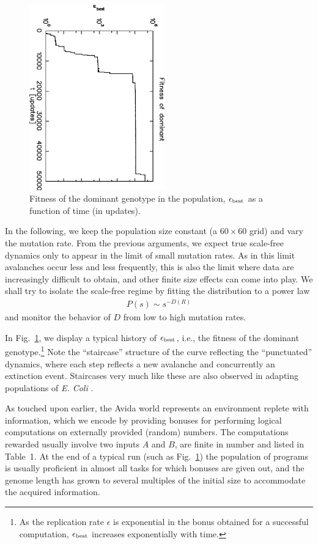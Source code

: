 \documentclass[letterpaper]{article}
\begin{document}
\begin{figure}[t]
\includegraphics[width=2.3in, angle=90]{fig2.eps}
\caption{Fitness of the dominant genotype in the population, $\epsilon_{\rm best}$ as a function of time (in updates).}
\label{fig2}
\end{figure}


In the following, we keep the population size constant (a $60\times60$
grid) and vary the mutation rate. From the previous arguments, we
expect true scale-free dynamics only to appear in the limit of small
mutation rates.  As in this limit avalanches occur less and less
frequently, this is also the limit where data are increasingly
difficult to obtain, and other finite size effects can come into play.
We shall try to isolate the scale-free regime by fitting the
distribution to a power law
\begin{eqnarray}
P(s)\sim s^{-D(R)}\label{power}
\end{eqnarray}
and monitor the behavior of $D$ from low to high mutation rates.

In Fig.~\ref{fig2}, we display a typical history of $\epsilon_{\rm
best}$, i.e., the fitness of the dominant genotype.\footnote{As the
replication rate $\epsilon$ is exponential in the bonus obtained for a
successful computation, $\epsilon_{\rm best}$ increases exponentially
with time.}  Note the ``staircase'' structure of the curve reflecting
the ``punctuated'' dynamics, where each step reflects a new avalanche
and concurrently an extinction event. Staircases very much like these
are also observed in adapting populations of {\it E. Coli}
\citep{LT94}.

As touched upon earlier, the Avida world represents an environment
replete with information, which we encode by providing bonuses for
performing logical computations on externally provided (random)
numbers. The computations rewarded usually involve two inputs $A$ and
$B$, are finite in number and listed in Table~1. At the end of a
typical run (such as Fig.~\ref{fig2}) the population of programs is
usually proficient in almost all tasks for which bonuses are given
out, and the genome length has grown to several multiples of the
initial size to accommodate the acquired information.
\end{document}

